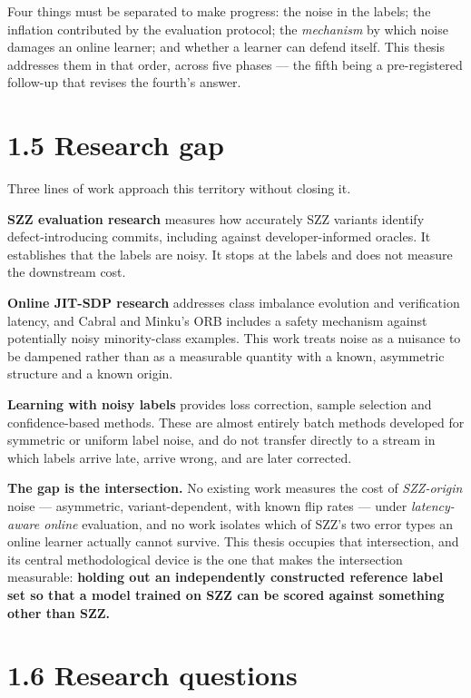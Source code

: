 Four things must be separated to make progress: the noise in the labels;
the inflation contributed by the evaluation protocol; the
\emph{mechanism} by which noise damages an online learner; and whether a
learner can defend itself. This thesis addresses them in that order,
across five phases --- the fifth being a pre-registered follow-up that
revises the fourth's answer.

\section{1.5 Research gap}\label{research-gap}

Three lines of work approach this territory without closing it.

\textbf{SZZ evaluation research} measures how accurately SZZ variants
identify defect-introducing commits, including against
developer-informed oracles. It establishes that the labels are noisy. It
stops at the labels and does not measure the downstream cost.

\textbf{Online JIT-SDP research} addresses class imbalance evolution and
verification latency, and Cabral and Minku's ORB includes a safety
mechanism against potentially noisy minority-class examples. This work
treats noise as a nuisance to be dampened rather than as a measurable
quantity with a known, asymmetric structure and a known origin.

\textbf{Learning with noisy labels} provides loss correction, sample
selection and confidence-based methods. These are almost entirely batch
methods developed for symmetric or uniform label noise, and do not
transfer directly to a stream in which labels arrive late, arrive wrong,
and are later corrected.

\textbf{The gap is the intersection.} No existing work measures the cost
of \emph{SZZ-origin} noise --- asymmetric, variant-dependent, with known
flip rates --- under \emph{latency-aware online} evaluation, and no work
isolates which of SZZ's two error types an online learner actually
cannot survive. This thesis occupies that intersection, and its central
methodological device is the one that makes the intersection measurable:
\textbf{holding out an independently constructed reference label set so
that a model trained on SZZ can be scored against something other than
SZZ.}

\section{1.6 Research questions}\label{research-questions}

